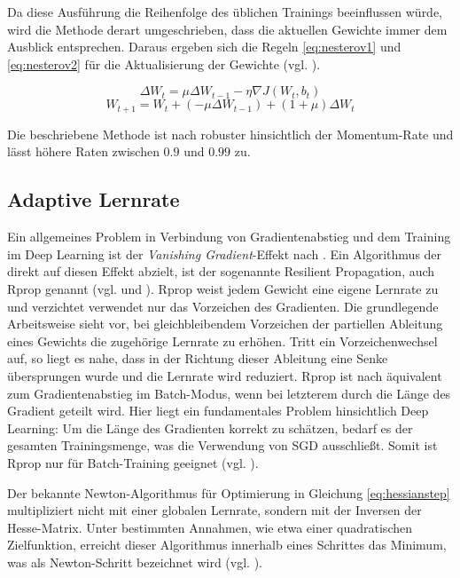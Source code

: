 Da diese Ausführung die Reihenfolge des üblichen Trainings beeinflussen würde, wird die Methode derart umgeschrieben, dass die aktuellen Gewichte immer dem Ausblick entsprechen. Daraus ergeben sich die Regeln \ref{eq:nesterov1} und \ref{eq:nesterov2} für die Aktualisierung der Gewichte (vgl. \cite{Kaparthy2014}).


\begin{equation}
\label{eq:nesterov1} 
\Delta W_t = \mu \Delta W_{t-1} - \eta  \nabla J(W_t,b_t)
\end{equation}
\begin{equation}
\label{eq:nesterov2} 
W_{t+1} = W_t + (-\mu \Delta W_{t-1} ) + (1 + \mu) \Delta W_t
\end{equation}

Die beschriebene Methode ist nach \cite{Sutskever2013} robuster hinsichtlich der Momentum-Rate und lässt höhere Raten zwischen $0.9$ und $0.99$ zu. 

\subsection{Adaptive Lernrate}
\label{ch:2norder}
Ein allgemeines Problem in Verbindung von Gradientenabstieg und dem Training im Deep Learning ist der \textit{Vanishing Gradient}-Effekt nach \cite{Hochreiter1991}. Ein Algorithmus der direkt auf diesen Effekt abzielt, ist der sogenannte Resilient Propagation, auch Rprop genannt (vgl. \cite{Riedmiller1992} und \cite{Igel2000}). Rprop weist jedem Gewicht eine eigene Lernrate zu und verzichtet verwendet nur das Vorzeichen des Gradienten. Die grundlegende Arbeitsweise sieht vor, bei gleichbleibendem Vorzeichen der partiellen Ableitung eines Gewichts die zugehörige Lernrate zu erhöhen. Tritt ein Vorzeichenwechsel auf, so liegt es nahe, dass in der Richtung dieser Ableitung eine Senke übersprungen wurde und die Lernrate wird reduziert. Rprop ist nach \cite{Hinton2015} äquivalent zum Gradientenabstieg im Batch-Modus, wenn bei letzterem durch die Länge des Gradient geteilt wird.
Hier liegt ein fundamentales Problem hinsichtlich Deep Learning: Um die Länge des Gradienten korrekt zu schätzen, bedarf es der gesamten Trainingsmenge, was die Verwendung von SGD ausschließt. Somit ist Rprop nur für Batch-Training geeignet (vgl. \cite{Hinton2015}).



Der bekannte Newton-Algorithmus für Optimierung in Gleichung \ref{eq:hessianstep} multipliziert nicht mit einer globalen Lernrate, sondern mit der Inversen der Hesse-Matrix. Unter bestimmten Annahmen, wie etwa einer quadratischen Zielfunktion, erreicht dieser Algorithmus innerhalb eines Schrittes das Minimum, was als Newton-Schritt bezeichnet wird (vgl. \cite{Bottou1998}).

